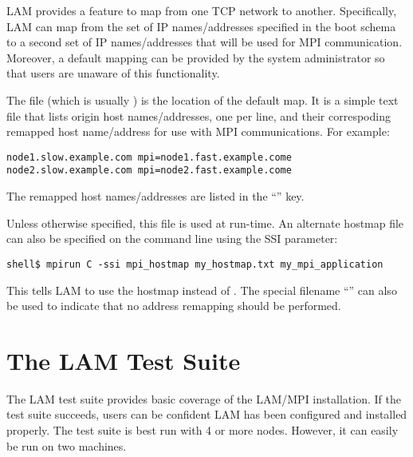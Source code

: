 LAM provides a feature to map from one TCP network to another.
Specifically, LAM can map from the set of IP names/addresses specified
in the boot schema to a second set of IP names/addresses that will be
used for MPI communication.  Moreover, a default mapping can be
provided by the system administrator so that users are unaware of this
functionality.

The file  (which is usually
) is the location of the default
map.  It is a simple text file that lists origin host names/addresses,
one per line, and their correspoding remapped host name/address for
use with MPI communications.  For example:

\lstset{style=lam-cmdline}
\begin{lstlisting}
node1.slow.example.com mpi=node1.fast.example.come
node2.slow.example.com mpi=node2.fast.example.come
\end{lstlisting}

The remapped host names/addresses are listed in the ``''
key.

Unless otherwise specified, this  file is used
at run-time.  An alternate hostmap file can also be specified on the
 command line using the  SSI
parameter:

\lstset{style=lam-cmdline}
\begin{lstlisting}
shell$ mpirun C -ssi mpi_hostmap my_hostmap.txt my_mpi_application
\end{lstlisting}

This tells LAM to use the hostmap  instead of
.  The special filename
``'' can also be used to indicate that no address
remapping should be performed.





\section{The LAM Test Suite}

The LAM test suite provides basic coverage of the LAM/MPI
installation.  If the test suite succeeds, users can be confident LAM
has been configured and installed properly.  The test suite is best
run with 4 or more nodes.  However, it can easily be run on two
machines.

